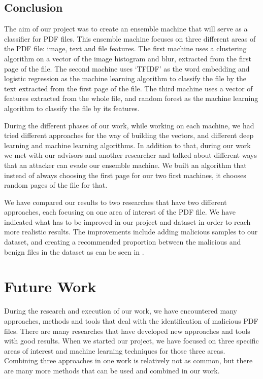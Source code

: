 \documentclass{article}
\begin{document}
\subsection{Conclusion}
\indent The aim of our project was to create an ensemble machine that will serve as a classifier for PDF files. This ensemble machine focuses on three different areas of the PDF file: image, text and file features. The first machine uses a clustering algorithm on a vector of the image histogram and blur, extracted from the first page of the file. The second machine uses ‘TFIDF’ as the word embedding and logistic regression as the machine learning algorithm to classify the file by the text extracted from the first page of the file. The third machine uses a vector of features extracted from the whole file, and random forest as the machine learning algorithm to classify the file by its features.

\indent During the different phases of our work, while working on each machine, we had tried different approaches for the way of building the vectors, and different deep learning and machine learning algorithms. In addition to that, during our work we met with our advisors and another researcher and talked about different ways that an attacker can evade our ensemble machine. We built an algorithm that instead of always choosing the first page for our two first machines, it chooses random pages of the file for that. 

\indent We have compared our results to two researches that have two different approaches, each focusing on one area of interest of the PDF file. We have indicated what has to be improved in our project and dataset in order to reach more realistic results. The improvements include adding malicious samples to our dataset, and creating a recommended proportion between the malicious and benign files in the dataset as can be seen in \cite{BGU2014malicious}.

\section{Future Work}
\indent During the research and execution of our work, we have encountered many approaches, methods and tools that deal with the identification of malicious PDF files. There are many researches that have developed new approaches and tools with good results. When we started our project, we have focused on three specific areas of interest and machine learning techniques for those three areas. Combining three approaches in one work is relatively not as common, but there are many more methods that can be used and combined in our work. 
\end{document}
